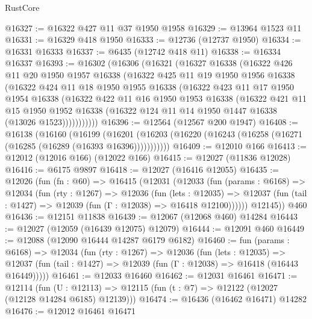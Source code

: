 \begin{lexlean}{RustCore}
\begin{coremodule}
@16327 := @16322 @427 @11 @37 @1950 @1958
@16329 := @13964 @1523 @11
@16331 := @16329 @418 @1950
@16333 := @12736 (@12737 @1950)
@16334 := @16331 @16333
@16337 := @6435 (@12742 @418 @11)
@16338 := @16334 @16337
@16393 := @16302
    (@16306
      (@16321
        (@16327
          @16338
          (@16322
            @426
            @11
            @20
            @1950
            @1957
            @16338
            (@16322
              @425
              @11
              @19
              @1950
              @1956
              @16338
              (@16322
                @424
                @11
                @18
                @1950
                @1955
                @16338
                (@16322
                  @423
                  @11
                  @17
                  @1950
                  @1954
                  @16338
                  (@16322
                    @422
                    @11
                    @16
                    @1950
                    @1953
                    @16338
                    (@16322
                      @421
                      @11
                      @15
                      @1950
                      @1952
                      @16338
                      (@16322 @124 @11 @14 @1950 @1447 @16338 (@13026 @1523)))))))))))
@16396 := @12564 (@12567 @200 @1947)
@16408 := @16138
    (@16160
      (@16199
        (@16201 (@16203 (@16220 (@16243 (@16258 (@16271 (@16285 (@16289 (@16393 @16396)))))))))))
@16409 := @12010 @166
@16413 := @12012 (@12016 @166) (@12022 @166)
@16415 := @12027 (@11836 @12028)
@16416 := @6175 @9897
@16418 := @12027 (@16416 @12055)
@16435 := @12026
    (fun (fn : @60) =>
    @16415
      (@12031
        (@12033
          (fun (params : @6168) =>
          @12034
            (fun (rty : @1267) =>
            @12036
              (fun (lets : @12035) =>
              @12037 (fun (tail : @1427) => @12039 (fun (Γ : @12038) => @16418 @12100))))))
        @12145))
    @460
@16436 := @12151 @11838
@16439 := @12067 (@12068 @460) @14284
@16443 := @12027 (@12059 (@16439 @12075) @12079)
@16444 := @12091 @460
@16449 := @12088 (@12090 @16444 @14287 @6179 @6182)
@16460 := fun (params : @6168) =>
  @12034
    (fun (rty : @1267) =>
    @12036
      (fun (lets : @12035) =>
      @12037 (fun (tail : @1427) => @12039 (fun (Γ : @12038) => @16418 (@16443 @16449)))))
@16461 := @12033 @16460
@16462 := @12031 @16461
@16471 := @12114
    (fun (U : @12113) => @12115 (fun (t : @7) => @12122 (@12027 (@12128 @14284 @6185) @12139)))
@16474 := @16436 (@16462 @16471) @14282
@16476 := @12012 @16461 @16471

\end{coremodule}
\end{lexlean}
